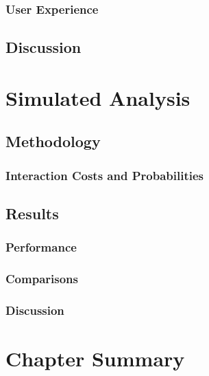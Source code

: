 \subsubsection{User Experience}

\subsection{Discussion}

\section{Simulated Analysis}\label{chap:snippets:simulations}

\subsection{Methodology}

\subsubsection{Interaction Costs and Probabilities}

\subsection{Results}

\subsubsection{Performance}

\subsubsection{Comparisons}

\subsubsection{Discussion}

\section{Chapter Summary}
